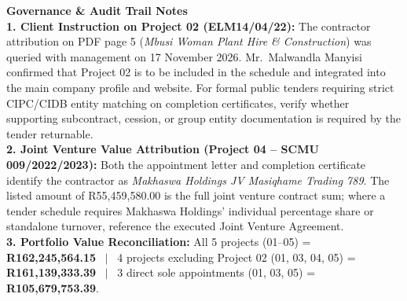 \documentclass[a4paper,landscape,10pt]{article}
\begin{document}
{\footnotesize\color{MHText}
\textbf{\color{MHNavy}Governance \& Audit Trail Notes}\\[4pt]
\color{MHMuted}
\textbf{1. Client Instruction on Project 02 (ELM14/04/22):}
The contractor attribution on PDF page 5 (\textit{Mbusi Woman Plant Hire \& Construction}) was queried with management on 17 November 2026. Mr.\ Malwandla Manyisi confirmed that Project 02 is to be included in the schedule and integrated into the main company profile and website. For formal public tenders requiring strict CIPC/CIDB entity matching on completion certificates, verify whether supporting subcontract, cession, or group entity documentation is required by the tender returnable.\\[3pt]
\textbf{2. Joint Venture Value Attribution (Project 04 -- SCMU 009/2022/2023):}
Both the appointment letter and completion certificate identify the contractor as \textit{Makhaswa Holdings JV Masiqhame Trading 789}. The listed amount of R55,459,580.00 is the full joint venture contract sum; where a tender schedule requires Makhaswa Holdings' individual percentage share or standalone turnover, reference the executed Joint Venture Agreement.\\[3pt]
\textbf{3. Portfolio Value Reconciliation:}
All 5 projects (01--05) = \textbf{R162,245,564.15} \ $|$ \ 4 projects excluding Project 02 (01, 03, 04, 05) = \textbf{R161,139,333.39} \ $|$ \ 3 direct sole appointments (01, 03, 05) = \textbf{R105,679,753.39}.
}
\end{document}
